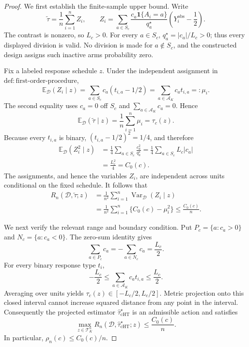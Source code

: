 \documentclass{article}
\begin{document}
\begin{proof}
We first establish the finite-sample upper bound.  Write
\[
 \widetilde\tau=\frac1n\sum_{i=1}^n Z_i,
 \qquad
 Z_i=\sum_{a\in S_c}
 \frac{c_a\mathbf 1\{A_i=a\}}{q_a^\star}
 \left(Y_i^{\mathrm{obs}}-\frac12\right).
\]
The contrast is nonzero, so \(L_c>0\).  For every \(a\in S_c\),
\(q_a^\star=|c_a|/L_c>0\); thus every displayed division is valid.  No
division is made for \(a\notin S_c\), and the constructed design assigns
such inactive arms probability zero.

Fix a labeled response schedule \(z\).  Under the independent assignment
in \(\mathrm{def:first\text{-}order\text{-}procedure}\),
\[
 \mathbb E_{\mathcal D}(Z_i\mid z)
 =\sum_{a\in S_c}c_a(t_{i,a}-1/2)
 =\sum_{a\in\mathcal A_K}c_at_{i,a}
 =:\mu_i.
\]
The second equality uses \(c_a=0\) off \(S_c\) and
\(\sum_{a\in\mathcal A_K}c_a=0\).  Hence
\[
 \mathbb E_{\mathcal D}(\widetilde\tau\mid z)
 =\frac1n\sum_{i=1}^n\mu_i=\tau_c(z).
\]
Because every \(t_{i,a}\) is binary,
\((t_{i,a}-1/2)^2=1/4\), and therefore
\[
 \begin{aligned}
 \mathbb E_{\mathcal D}(Z_i^2\mid z)
 &=\frac14\sum_{a\in S_c}\frac{c_a^2}{q_a^\star}
 =\frac14\sum_{a\in S_c}L_c|c_a|\\
 &=\frac{L_c^2}{4}=C_0(c).
 \end{aligned}
\]
The assignments, and hence the variables \(Z_i\), are independent across
units conditional on the fixed schedule.  It follows that
\[
 \begin{aligned}
 R_n(\mathcal D,\widetilde\tau;z)
 &=\frac1{n^2}\sum_{i=1}^n
   \operatorname{Var}_{\mathcal D}(Z_i\mid z)\\
 &=\frac1{n^2}\sum_{i=1}^n\{C_0(c)-\mu_i^2\}
 \le \frac{C_0(c)}n.
 \end{aligned}
\]

We next verify the relevant range and boundary condition.  Put
\(P_c=\{a:c_a>0\}\) and \(N_c=\{a:c_a<0\}\).  The zero-sum identity gives
\[
 \sum_{a\in P_c}c_a=-\sum_{a\in N_c}c_a=\frac{L_c}{2}.
\]
For every binary response type \(t_i\),
\[
 -\frac{L_c}{2}
 \le \sum_{a\in\mathcal A_K}c_at_{i,a}
 \le \frac{L_c}{2}.
\]
Averaging over units yields
\(\tau_c(z)\in[-L_c/2,L_c/2]\).  Metric projection onto this closed
interval cannot increase squared distance from any point in the interval.
Consequently the projected estimator \(\widehat\tau_{\mathrm{cHT}}^\star\)
is an admissible action and satisfies
\[
 \max_{z\in\mathcal T_K^n}
 R_n(\mathcal D,\widehat\tau_{\mathrm{cHT}}^\star;z)
 \le \frac{C_0(c)}n.
\]
In particular, \(\rho_n(c)\le C_0(c)/n\).


\end{proof}
\end{document}
